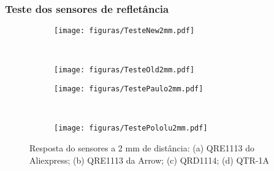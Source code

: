 \begin{frame}
\frametitle{Teste dos sensores de refletância}
\begin{figure}[h]
     \centering
     \captionsetup{width=0.8\textwidth,font=footnotesize,textfont=bf}
     \begin{subfigure}[b]{0.3\textwidth}
 	\centering
         \texttt{[image: figuras/TesteNew2mm.pdf]}
         \caption{\centering \label{fig:TesteNew2mm}}
     \end{subfigure}
     ~
     \begin{subfigure}[b]{0.3\textwidth}
 	\centering
         \texttt{[image: figuras/TesteOld2mm.pdf]}
         \caption{\centering \label{fig:TesteOld2mm}}
     \end{subfigure}
     
     \captionsetup{width=\textwidth,font=footnotesize,textfont=bf}
     \begin{subfigure}[b]{0.3\textwidth}
 	\centering
         \texttt{[image: figuras/TestePaulo2mm.pdf]}
         \caption{\centering \label{fig:TestePaulo2mm}}
     \end{subfigure}
     ~ 
     \begin{subfigure}[b]{0.3\textwidth}
 	\centering
         \texttt{[image: figuras/TestePololu2mm.pdf]}
         \caption{\centering \label{fig:TestePololu2mm}}
     \end{subfigure}

     \caption{Resposta do sensores a 2 mm de distância: (a) QRE1113 do Aliexpress; (b) QRE1113 da Arrow; (c) QRD1114; (d) QTR-1A}

 \end{figure}
\end{frame}


